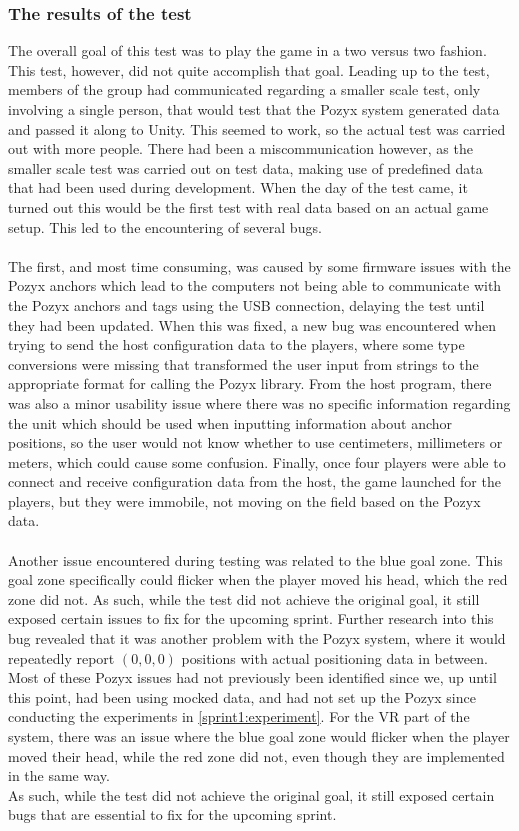 \subsubsection{The results of the test}
The overall goal of this test was to play the game in a two versus two fashion.
This test, however, did not quite accomplish that goal.
Leading up to the test, members of the group had communicated regarding a smaller scale test, only involving a single person, that would test that the Pozyx system generated data and passed it along to Unity.
This seemed to work, so the actual test was carried out with more people.
There had been a miscommunication however, as the smaller scale test was carried out on test data, making use of predefined data that had been used during development.
When the day of the test came, it turned out this would be the first test with real data based on an actual game setup.
This led to the encountering of several bugs.
\\\\
The first, and most time consuming, was caused by some firmware issues with the Pozyx anchors which lead to the computers not being able to communicate with the Pozyx anchors and tags using the USB connection, delaying the test until they had been updated.
When this was fixed, a new bug was encountered when trying to send the host configuration data to the players, where some type conversions were missing that transformed the user input from strings to the appropriate format for calling the Pozyx library.
From the host program, there was also a minor usability issue where there was no specific information regarding the unit which should be used when inputting information about anchor positions, so the user would not know whether to use centimeters, millimeters or meters, which could cause some confusion.
Finally, once four players were able to connect and receive configuration data from the host, the game launched for the players, but they were immobile, not moving on the field based on the Pozyx data.
\\\\
Another issue encountered during testing was related to the blue goal zone.
This goal zone specifically could flicker when the player moved his head, which the red zone did not.
As such, while the test did not achieve the original goal, it still exposed certain issues to fix for the upcoming sprint.
Further research into this bug revealed that it was another problem with the Pozyx system, where it would repeatedly report $(0,0,0)$ positions with actual positioning data in between.\\
Most of these Pozyx issues had not previously been identified since we, up until this point, had been using mocked data, and had not set up the Pozyx since conducting the experiments in \autoref{sprint1:experiment}.
For the VR part of the system, there was an issue where the blue goal zone would flicker when the player moved their head, while the red zone did not, even though they are implemented in the same way.\\
As such, while the test did not achieve the original goal, it still exposed certain bugs that are essential to fix for the upcoming sprint.

